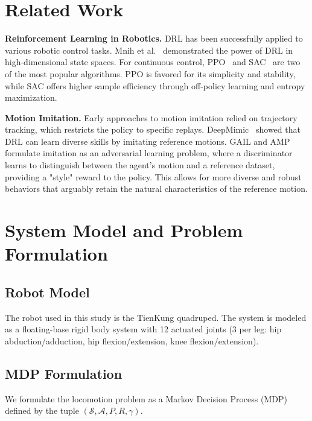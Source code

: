 \documentclass[conference]{IEEEtran}
\begin{document}
\section{Related Work}

\textbf{Reinforcement Learning in Robotics.} DRL has been successfully applied to various robotic control tasks. Mnih et al.~\cite{mnih2015human} demonstrated the power of DRL in high-dimensional state spaces. For continuous control, PPO~\cite{schulman2017proximal} and SAC~\cite{haarnoja2018soft} are two of the most popular algorithms. PPO is favored for its simplicity and stability, while SAC offers higher sample efficiency through off-policy learning and entropy maximization.

\textbf{Motion Imitation.} Early approaches to motion imitation relied on trajectory tracking, which restricts the policy to specific replays. DeepMimic~\cite{peng2018deepmimic} showed that DRL can learn diverse skills by imitating reference motions. GAIL and AMP~\cite{peng2021amp} formulate imitation as an adversarial learning problem, where a discriminator learns to distinguish between the agent's motion and a reference dataset, providing a "style" reward to the policy. This allows for more diverse and robust behaviors that arguably retain the natural characteristics of the reference motion.

\section{System Model and Problem Formulation}\label{sec:Chapter2}

\subsection{Robot Model}
The robot used in this study is the TienKung quadruped. The system is modeled as a floating-base rigid body system with 12 actuated joints (3 per leg: hip abduction/adduction, hip flexion/extension, knee flexion/extension).

\subsection{MDP Formulation}
We formulate the locomotion problem as a Markov Decision Process (MDP) defined by the tuple $(\mathcal{S}, \mathcal{A}, P, R, \gamma)$.
\end{document}
